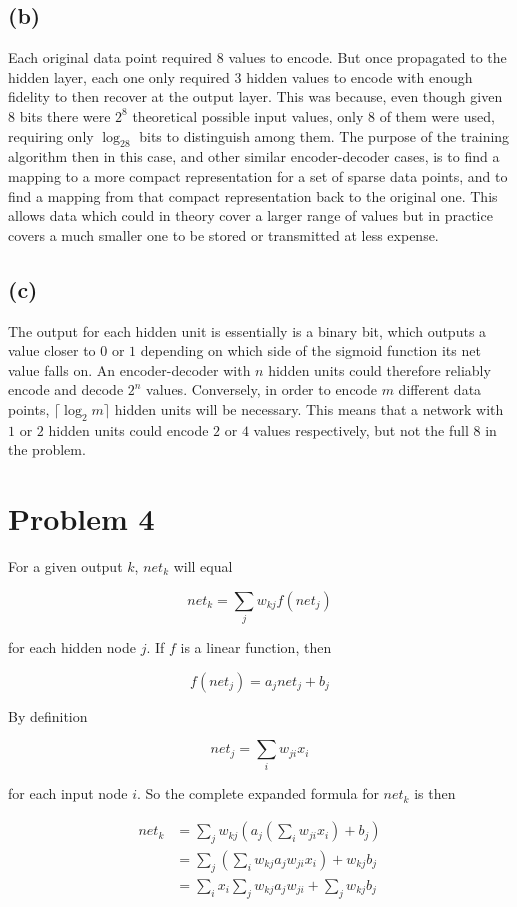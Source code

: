 \documentclass[12pt]{article}
\begin{document}
\subsection*{(b)}
Each original data point required 8 values to encode. But once propagated to the hidden layer, each one only required 3 hidden values to encode with enough fidelity to then recover at the output layer. This was because, even though given 8 bits there were $2^8$ theoretical possible input values, only $8$ of them were used, requiring only $\log_28$ bits to distinguish among them. The purpose of the training algorithm then in this case, and other similar encoder-decoder cases, is to find a mapping to a more compact representation for a set of sparse data points, and to find a mapping from that compact representation back to the original one. This allows data which could in theory cover a larger range of values but in practice covers a much smaller one to be stored or transmitted at less expense.

\subsection*{(c)}
The output for each hidden unit is essentially is a binary bit, which outputs a value closer to $0$ or $1$ depending on which side of the sigmoid function its net value falls on. An encoder-decoder with $n$ hidden units could therefore reliably encode and decode $2^n$ values. Conversely, in order to encode $m$ different data points, $\lceil\log_2m\rceil$ hidden units will be necessary. This means that a network with $1$ or $2$ hidden units could encode $2$ or $4$ values respectively, but not the full $8$ in the problem.

\section*{Problem 4}
	For a given output $k$, $net_k$ will equal
	
	$$net_k=\sum_jw_{kj}f(net_j)$$

	\noindent
	for each hidden node $j$. If $f$ is a linear function, then
	
	$$f(net_j)=a_jnet_j+b_j$$
	
	\noindent
	By definition
	
	$$net_j=\sum_iw_{ji}x_i$$
	
	\noindent
	for each input node $i$. So the complete expanded formula for $net_k$ is then
	
	\begin{align}
		net_k&=\sum_jw_{kj}\left(a_j\left(\sum_iw_{ji}x_i\right) + b_j\right) \\
		&= \sum_j\left(\sum_iw_{kj}a_jw_{ji}x_i\right) + w_{kj}b_j \\
		&= \sum_ix_i\sum_jw_{kj}a_jw_{ji} + \sum_jw_{kj}b_j
	\end{align}
	
\end{document}
